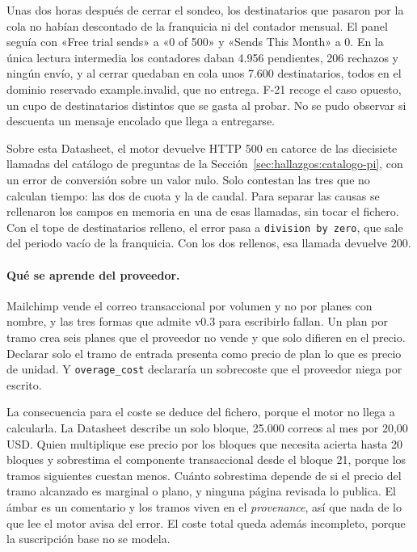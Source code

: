 Unas dos horas después de cerrar el sondeo, los destinatarios que pasaron por la
cola no habían descontado de la franquicia ni del contador mensual. El panel seguía
con «Free trial sends» a «0 of 500» y «Sends This Month» a 0. En la única lectura
intermedia los contadores daban 4.956 pendientes, 206 rechazos y ningún envío, y al
cerrar quedaban en cola unos 7.600 destinatarios, todos en el dominio reservado
example.invalid, que no entrega. F-21 recoge el
caso opuesto, un cupo de destinatarios distintos que se gasta al probar. No se pudo
observar si descuenta un mensaje encolado que llega a entregarse.

Sobre esta Datasheet, el motor devuelve HTTP 500 en catorce de las diecisiete llamadas
del catálogo de preguntas de la Sección~\ref{sec:hallazgos:catalogo-pi}, con un error
de conversión sobre un valor nulo. Solo contestan las tres que no calculan tiempo:
las dos de cuota y la de caudal. Para separar las causas se rellenaron los campos en
memoria en una de esas llamadas, sin tocar el fichero. Con el tope de destinatarios relleno, el error pasa a
\texttt{division by zero}, que sale del periodo vacío de la franquicia. Con los dos
rellenos, esa llamada devuelve 200.

\paragraph{Qué se aprende del proveedor.} Mailchimp vende el correo transaccional
por volumen y no por planes con nombre, y las tres formas que admite v0.3 para
escribirlo fallan. Un plan por tramo crea seis planes que el proveedor no vende y que
solo difieren en el precio. Declarar solo el tramo de entrada presenta como precio de
plan lo que es precio de unidad. Y \texttt{overage\_cost} declararía un sobrecoste
que el proveedor niega por escrito.

La consecuencia para el coste se deduce del fichero, porque el motor no llega a
calcularla. La Datasheet describe un solo bloque, 25.000 correos al mes por 20,00
USD. Quien multiplique ese precio por los bloques que necesita acierta hasta 20
bloques y sobrestima el componente transaccional desde el bloque 21, porque los
tramos siguientes cuestan menos. Cuánto sobrestima depende de si el precio del tramo
alcanzado es marginal o plano, y ninguna página revisada lo publica. El ámbar es un
comentario y los tramos viven en el \textit{provenance}, así que nada de lo que lee el motor avisa
del error. El coste total queda además incompleto, porque la suscripción base no se
modela.

